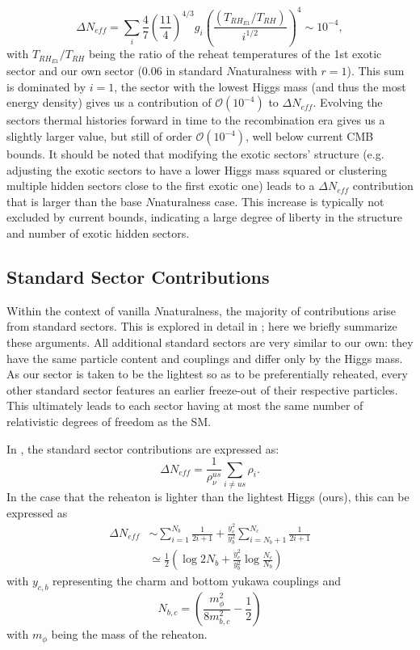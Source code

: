 \documentclass[nofootinbib,twocolumn,preprintnumbers]{revtex4-1}
\begin{document}
\begin{equation}
\Delta N_{eff} = \sum_i \frac{4}{7}\left(\frac{11}{4}\right)^{4/3}g_{i} \left(\frac{(T_{RH_{E1}}/T_{RH})}{i^{1/2}}\right)^4 \sim 10^{-4},
\end{equation}     
with $T_{RH_{E1}}/T_{RH}$ being the ratio of the reheat temperatures of the 1st exotic sector and our own sector ($0.06$ in standard $N$naturalness with $r = 1$).  This sum is dominated by $i=1$, the sector with the lowest Higgs mass (and thus the most energy density) gives us a contribution of $\mathcal{O} (10^{-4})$ to $\Delta N_{eff}$. Evolving the sectors thermal histories forward in time to the recombination era gives us a slightly larger value, but still of order $\mathcal{O}(10^{-4})$, well below current CMB bounds. 
It should be noted that modifying the exotic sectors' structure (e.g. adjusting the exotic sectors to have a lower Higgs mass squared or clustering multiple hidden sectors close to the first exotic one) leads to a $\Delta N_{eff}$ contribution that is larger than the base $N$naturalness case. This increase is typically not excluded by current bounds, indicating a large degree of liberty in the structure and number of exotic hidden sectors.

\subsection{Standard Sector Contributions}

Within the context of vanilla $N$naturalness, the majority of contributions arise from standard sectors. This is explored in detail in \cite{Arkani-Hamed:2016rle}; here we briefly summarize these arguments. All additional standard sectors are very similar to our own: they have the same particle content and couplings and differ only by the Higgs mass. As our sector is taken to be the lightest so as to be preferentially reheated, every other standard sector features an earlier freeze-out of their respective particles. This ultimately leads to each sector having at most the same number of relativistic degrees of freedom as the SM.

In \cite{Arkani-Hamed:2016rle}, the standard sector contributions are expressed as:
\begin{equation}
\Delta N_{eff} = \frac{1}{\rho^{us}_\nu} \sum_{i\neq us} \rho_i.
\end{equation}
In the case that the reheaton is lighter than the lightest Higgs (ours), this can be expressed as
\begin{equation}
\begin{split}
\Delta N_{eff} &\sim \sum^{N_b}_{i=1}\frac{1}{2i+1}+\frac{y_c^2}{y_b^2}\sum^{N_c}_{i=N_b + 1}\frac{1}{2i+1}\\
& \simeq \frac{1}{2}\left(\log 2N_b + \frac{y_c^2}{y_b^2}\log \frac{N_c}{N_b}\right)
\end{split}
\end{equation}
with $y_{c,b}$ representing the charm and bottom yukawa couplings and 
\begin{equation}
N_{b,c} = \left(\frac{m_\phi^2}{8m^2_{b,c}}-\frac{1}{2}\right)
\end{equation}
with $m_\phi$ being the mass of the reheaton.
\end{document}
